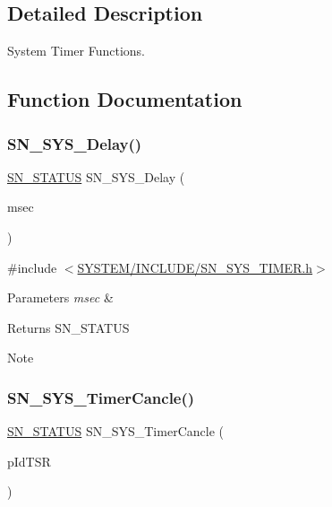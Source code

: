 \subsection{Detailed Description}
System Timer Functions. 



\subsection{Function Documentation}
\mbox{\label{group__SYSTEM__TIMER_ga4cf64b0280d940416955ba171ed339aa}} 
\subsubsection{\texorpdfstring{S\+N\+\_\+\+S\+Y\+S\+\_\+\+Delay()}{SN\_SYS\_Delay()}}
{\footnotesize\ttfamily \hyperlink{group__SYSTEM__ERROR_ga4540713b9a7a18ce44d78c3a10f7442f}{S\+N\+\_\+\+S\+T\+A\+T\+US} S\+N\+\_\+\+S\+Y\+S\+\_\+\+Delay (\begin{DoxyParamCaption}\item[{uint32\+\_\+t}]{msec }\end{DoxyParamCaption})}



{\ttfamily \#include $<$\hyperlink{SN__SYS__TIMER_8h}{S\+Y\+S\+T\+E\+M/\+I\+N\+C\+L\+U\+D\+E/\+S\+N\+\_\+\+S\+Y\+S\+\_\+\+T\+I\+M\+E\+R.\+h}$>$}


\begin{DoxyParams}{Parameters}
{\em msec} & \\
\hline
\end{DoxyParams}
\begin{DoxyReturn}{Returns}
S\+N\+\_\+\+S\+T\+A\+T\+US 
\end{DoxyReturn}
\begin{DoxyNote}{Note}

\end{DoxyNote}
\mbox{\label{group__SYSTEM__TIMER_gaa004347fdd0940a882a77729feaf60c4}} 
\subsubsection{\texorpdfstring{S\+N\+\_\+\+S\+Y\+S\+\_\+\+Timer\+Cancle()}{SN\_SYS\_TimerCancle()}}
{\footnotesize\ttfamily \hyperlink{group__SYSTEM__ERROR_ga4540713b9a7a18ce44d78c3a10f7442f}{S\+N\+\_\+\+S\+T\+A\+T\+US} S\+N\+\_\+\+S\+Y\+S\+\_\+\+Timer\+Cancle (\begin{DoxyParamCaption}\item[{sys\+Timer\+Id\+\_\+t $\ast$}]{p\+Id\+T\+SR }\end{DoxyParamCaption})}



